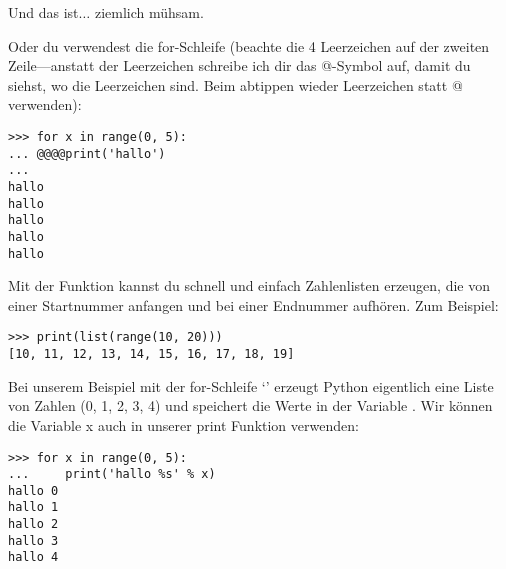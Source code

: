 Und das ist$\ldots$ ziemlich mühsam.

Oder du verwendest die for-Schleife (beachte die 4 Leerzeichen auf der zweiten Zeile---anstatt der Leerzeichen schreibe ich dir das @-Symbol auf, damit du siehst, wo die Leerzeichen sind. Beim abtippen wieder Leerzeichen statt @ verwenden):

\begin{listingignore}
\begin{verbatim}
>>> for x in range(0, 5):
... @@@@print('hallo')
... 
hallo
hallo
hallo
hallo
hallo
\end{verbatim}
\end{listingignore}

Mit der  Funktion kannst du schnell und einfach Zahlenlisten erzeugen, die von einer Startnummer anfangen und bei einer Endnummer aufhören. Zum Beispiel:

\begin{listing}
\begin{verbatim}
>>> print(list(range(10, 20)))
[10, 11, 12, 13, 14, 15, 16, 17, 18, 19]
\end{verbatim}
\end{listing}

Bei unserem Beispiel mit der for-Schleife `' erzeugt Python eigentlich eine Liste von Zahlen (0, 1, 2, 3, 4) und speichert die Werte in der Variable . Wir können die Variable x auch in unserer print Funktion verwenden:

\begin{listing}
\begin{verbatim}
>>> for x in range(0, 5):
...     print('hallo %s' % x)
hallo 0
hallo 1
hallo 2
hallo 3
hallo 4
\end{verbatim}
\end{listing}

